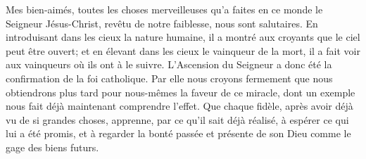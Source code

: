 Mes bien-aimés, toutes les choses merveilleuses
	qu’a faites en ce monde le Seigneur Jésus-Christ, revêtu de notre faiblesse,
	nous sont salutaires.
En introduisant dans les cieux la nature humaine,
	il a montré aux croyants que le ciel peut être ouvert;
	et en élevant dans les cieux le vainqueur de la mort,
	il a fait voir aux vainqueurs où ils ont à le suivre.
L’Ascension du Seigneur a donc été la confirmation de la foi catholique.
Par elle nous croyons fermement
	que nous obtiendrons plus tard pour nous-mêmes la faveur de ce miracle,
	dont un exemple nous fait déjà maintenant comprendre l’effet.
Que chaque fidèle, après avoir déjà vu de si grandes choses,
	apprenne, par ce qu’il sait déjà réalisé,
		à espérer ce qui lui a été promis,
	et à regarder la bonté passée et présente de son Dieu
		comme le gage des biens futurs.
